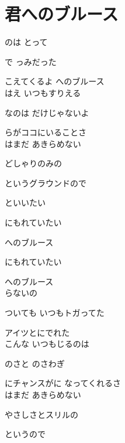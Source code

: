 \section{ 君へのブルース}
\large{

のは とって

で っみだった

こえてくるよ へのブルース
\\

はえ いつもすりえる

なのは だけじゃないよ

らがココにいることさ
\\

はまだ あきらめない

どしゃりのみの

というグラウンドので

といいたい

にもれていたい

へのブルース

にもれていたい

へのブルース
\\

らないの

ついても いつもトガってた

アイツとにでれた
\\

こんな いつもじるのは

のさと のさわぎ

にチャンスがに なってくれるさ
\\

はまだ あきらめない

やさしさとスリルの

というので

}
